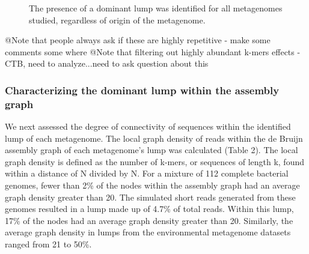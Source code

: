 \documentclass[11pt]{article} %
\begin{document}
\begin{figure}
\caption{The presence of a dominant lump was identified for all metagenomes studied, regardless of origin of the metagenome.}
\end{figure}

@Note that people always ask if these are highly repetitive - make some comments some where
@Note that filtering out highly abundant k-mers effects - CTB, need to analyze...need to ask question about this

\subsubsection{Characterizing the dominant lump within the assembly graph}

We next assessed the degree of connectivity of sequences within the identified lump of each metagenome.  The local graph density of reads within the de Bruijn assembly graph of each metagenome's lump was calculated (Table 2).  The local graph density is defined as the number of k-mers, or sequences of length k, found within a distance of N divided by N.  For a mixture of 112 complete bacterial genomes, fewer than 2\% of the nodes within the assembly graph had an average graph density greater than 20.   The simulated short reads generated from these genomes resulted in a lump made up of 4.7\% of total reads.  Within this lump, 17\% of the nodes had an average graph density greater than 20.  Similarly, the average graph density in lumps from the environmental metagenome datasets ranged from 21 to 50\%.  
\end{document}
